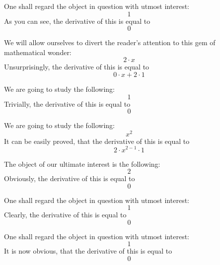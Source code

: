 \documentclass{article}
\begin{document}
One shall regard the object in question with utmost interest:
\begin{equation}
1 
\end{equation}
As you can see, the derivative of this is equal to
\begin{equation}
0 
\end{equation}

We will allow ourselves to divert the reader's attention to this gem of mathematical wonder:
\begin{equation}
2 \cdot x 
\end{equation}
Unsurprisingly, the derivative of this is equal to
\begin{equation}
0 \cdot x + 2 \cdot 1 
\end{equation}

We are going to study the following:
\begin{equation}
1 
\end{equation}
Trivially, the derivative of this is equal to
\begin{equation}
0 
\end{equation}

We are going to study the following:
\begin{equation}
x ^{2 } 
\end{equation}
It can be easily proved, that the derivative of this is equal to
\begin{equation}
2 \cdot x ^{2 - 1 } \cdot 1 
\end{equation}

The object of our ultimate interest is the following:
\begin{equation}
2 
\end{equation}
Obviously, the derivative of this is equal to
\begin{equation}
0 
\end{equation}

One shall regard the object in question with utmost interest:
\begin{equation}
1 
\end{equation}
Clearly, the derivative of this is equal to
\begin{equation}
0 
\end{equation}

One shall regard the object in question with utmost interest:
\begin{equation}
1 
\end{equation}
It is now obvious, that the derivative of this is equal to
\begin{equation}
0 
\end{equation}
\end{document}

